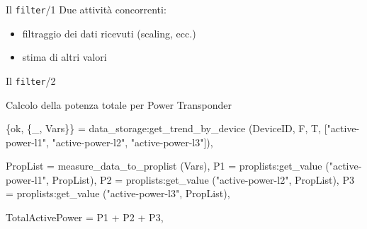\documentclass{beamer}
\newcommand{\red}[1]{\textcolor[rgb]{.8,0,0}{#1}}
\newcommand{\blue}[1]{\textcolor[rgb]{0,0,.7}{#1}}
\begin{document}
%
\begin{frame}{Il \texttt{filter}/1}
%
Due attivit\`a concorrenti:
\begin{itemize}
\item \red{filtraggio} dei dati ricevuti (scaling, ecc.)
\item \red{stima} di altri valori
\end{itemize}  
%
\begin{figure}[!h]
  \begin{center}
  \end{center}
\end{figure}
\end{frame}
%

%
\begin{frame}[fragile]{Il \texttt{filter}/2}
  \begin{exampleblock}{Calcolo della potenza totale per Power Transponder}
    \begin{semiverbatim}
      \begin{small}
\{ok, \{_, \blue{Vars}\}\} = 
  \red{data_storage:get_trend_by_device} (\blue{DeviceID}, F, T, 
                                   ["active-power-l1",
                                    "active-power-l2",
                                    "active-power-l3"]),
	      
\blue{PropList} = \red{measure_data_to_proplist} (\blue{Vars}),
\blue{P1} = \red{proplists:get_value} ("active-power-l1", \blue{PropList}),
\blue{P2} = \red{proplists:get_value} ("active-power-l2", \blue{PropList}),
\blue{P3} = \red{proplists:get_value} ("active-power-l3", \blue{PropList}),
	      
\blue{TotalActivePower} = \blue{P1} + \blue{P2} + \blue{P3}, 
\end{small}
    \end{semiverbatim}
  \end{exampleblock}
\end{frame}
\end{document}
